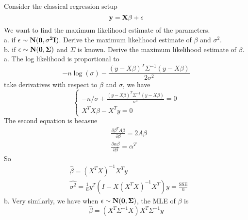 \documentclass[12pt]{article}
\begin{document}
 {
Consider the classical regression setup
\[\bf{y}=\bf{X}\bf{\beta}+\bf{\epsilon}\]
We want to find the maximum likelihood estimate of the parameters.\\
a. if $\bf{\epsilon}\sim N(\bf{0},\sigma^2\bf{I})$. Derive the maximum likelihood estimate of $\beta$ and $\sigma^2$.\\
b. if $\bf{\epsilon}\sim N(\bf{0},\Sigma)$ and $\Sigma$ is known. Derive the maximum likelihood estimate of $\beta$.
}
{ \vfill
  \answer
}{
  a. The log likelihood is proportional to
  \[-n\log(\sigma)-\frac{(y-X\beta)^T\Sigma^{-1}(y-X\beta)}{2\sigma^2}\]
  take derivatives with respect to $\beta$ and $\sigma$, we have
  \[\left\{
    \begin{array}{l}  -n/\sigma+\frac{(y-X\beta)^T\Sigma^{-1}(y-X\beta)}{\sigma^3}=0\\
      X^TX\beta-X^Ty=0
     \end{array} \right. \]
  The second equation is becasue
  \begin{align*}
    &\frac{\partial\beta^TA\beta}{\partial \beta}=2A\beta\\
    &\frac{\partial \alpha\beta}{\partial\beta}=\alpha^T
  \end{align*}
  So
  \begin{align*}
   &\hat{\beta}=(X^TX)^{-1}X^Ty\\
   &\hat{\sigma^2}=\frac{1}{n}y^T(I-X(X^TX)^{-1}X^T)y=\frac{\text{SSE}}{n}
  \end{align*}
b. Very similarly, we have when $\bf{\epsilon}\sim N(\bf{0},\Sigma)$, the MLE of $\beta$ is
\[\hat{\beta}=(X^T\Sigma^{-1}X)X^T\Sigma^{-1}y\]
}
\end{document}
